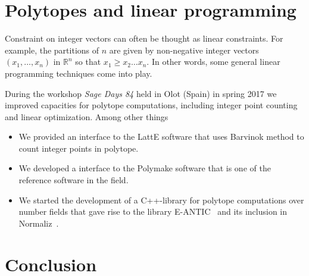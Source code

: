 \documentclass{deliverablereport}
\begin{document}
\section{Polytopes and linear programming}

Constraint on integer vectors can often be thought as linear constraints.
For example, the partitions of $n$ are given by non-negative integer
vectors $(x_1, \ldots, x_n)$ in $\mathbb{R}^n$ so that $x_1 \geq x_2 \ldots x_n$.
In other words, some general linear programming techniques come into
play.

During the \ODK workshop \textit{Sage Days 84} held in Olot (Spain) in spring
2017 we improved \Sage capacities for polytope computations, including
integer point counting and linear optimization. Among other things
\begin{itemize}
\item We provided an interface to the LattE software that uses Barvinok
method to count integer points in polytope.
\item We developed a \Sage interface to the Polymake software that is
one of the reference software in the field.
\item We started the development of a C++-library for polytope computations
over number fields that gave rise to the library E-ANTIC~\cite{eantic-code}
 and its inclusion in Normaliz~\cite{normaliz-code}.
\end{itemize}
        

\section{Conclusion}

\printbibliography
\end{document}
